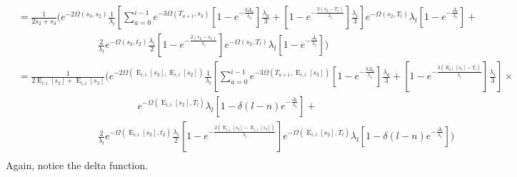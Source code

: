 \documentclass{article}
\DeclareMathOperator{\E}{E}
\begin{document}
\begin{align*}
    &=\frac{1}{2s_2+s_3}\Bigg(
    e^{-2\Omega(s_3,s_2)}\frac{1}{\lambda_l}\left[\sum_{a=0}^{i-1} e^{-3\Omega(T_{a+1},s_3)}
    \left[1-e^{-\frac{3 \Delta_a}{\lambda_a}}\right]\frac{\lambda_a}{3}+
    \left[1-e^{-\frac{3 \left(s_3-T_{i}\right)}{\lambda_{i}}}\right]\frac{\lambda_{i}}{3}\right]
    e^{-\Omega(s_2,T_l)}\lambda_l\left[1-e^{-\frac{\Delta_l}{\lambda_l}}\right]+\\
    &\qquad\qquad\qquad\qquad
    \frac{2}{\lambda_l}e^{-\Omega(s_2,t_2)}\frac{\lambda_i}{2}\left[1-e^{-\frac{2(s_2-s_3)}{\lambda_i}}\right]
    e^{-\Omega(s_2,T_l)}\lambda_l\left[1-e^{-\frac{\Delta_l}{\lambda_l}}\right]
    \Bigg)\\
    &=\frac{1}{2\E_{i,i}[s_2]+\E_{i,i}[s_3]}\Bigg(
    e^{-2\Omega(\E_{i,i}[s_3],\E_{i,i}[s_2])}\frac{1}{\lambda_l}\left[\sum_{a=0}^{i-1} e^{-3\Omega(T_{a+1},\E_{i,i}[s_3])}
    \left[1-e^{-\frac{3 \Delta_a}{\lambda_a}}\right]\frac{\lambda_a}{3}+
    \left[1-e^{-\frac{3 \left(\E_{i,i}[s_3]-T_{i}\right)}{\lambda_{i}}}\right]\frac{\lambda_{i}}{3}\right]\times\\
    &\qquad\qquad\qquad\qquad\qquad\qquad
    e^{-\Omega(\E_{i,i}[s_2],T_l)}\lambda_l\left[1-\delta(l-n)e^{-\frac{\Delta_l}{\lambda_l}}\right]+\\
    &\qquad\qquad\qquad\qquad
    \frac{2}{\lambda_l}e^{-\Omega(\E_{i,i}[s_2],t_2)}\frac{\lambda_i}{2}\left[1-e^{-\frac{2(\E_{i,i}[s_2]-\E_{i,i}[s_3])}{\lambda_i}}\right]
    e^{-\Omega(\E_{i,i}[s_2],T_l)}\lambda_l\left[1-\delta(l-n)e^{-\frac{\Delta_l}{\lambda_l}}\right]
    \Bigg)\\
\end{align*}
Again, notice the delta function.
\end{document}
